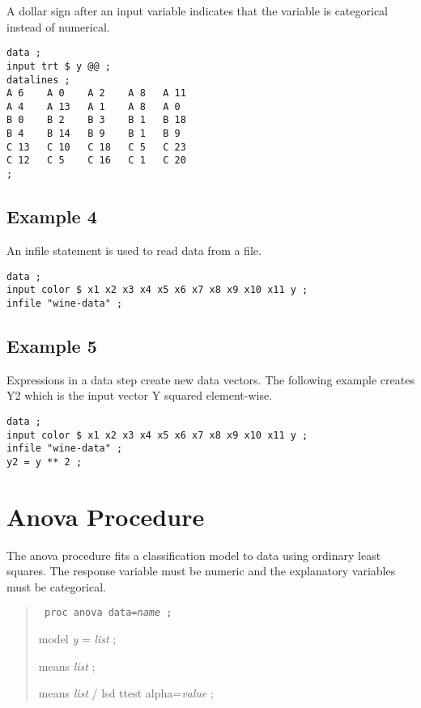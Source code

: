 \documentclass[12pt]{article}
\begin{document}
A dollar sign after an input variable indicates that the variable
is categorical instead of numerical.

{\scriptsize\begin{verbatim}
data ;
input trt $ y @@ ;
datalines ;
A 6    A 0    A 2    A 8   A 11
A 4    A 13   A 1    A 8   A 0
B 0    B 2    B 3    B 1   B 18
B 4    B 14   B 9    B 1   B 9
C 13   C 10   C 18   C 5   C 23
C 12   C 5    C 16   C 1   C 20
;
\end{verbatim}}

\subsection*{Example 4}

An infile statement is used to read data from a file.

{\scriptsize\begin{verbatim}
data ;
input color $ x1 x2 x3 x4 x5 x6 x7 x8 x9 x10 x11 y ;
infile "wine-data" ;
\end{verbatim}}

\subsection*{Example 5}

Expressions in a data step create new data vectors.
The following example creates Y2 which is the input
vector Y squared element-wise.

{\scriptsize\begin{verbatim}
data ;
input color $ x1 x2 x3 x4 x5 x6 x7 x8 x9 x10 x11 y ;
infile "wine-data" ;
y2 = y ** 2 ;
\end{verbatim}}

\newpage

\section{Anova Procedure}

The anova procedure fits a classification model
to data using ordinary least squares.
The response variable must be numeric and the
explanatory variables must be categorical.

\begin{quote}
{\tt
proc anova data={\it name} ;

model {\it y} = {\it list} ;

means {\it list} ;

means {\it list} / lsd ttest alpha={\it value} ;
}
\end{quote}
\end{document}
